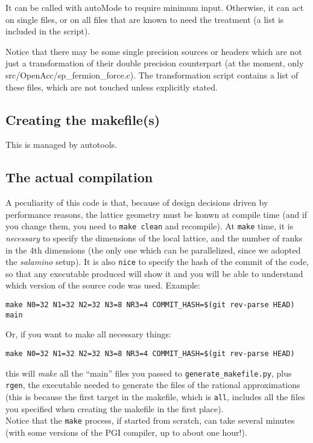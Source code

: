 It can be called with {\sf autoMode} to require minimum input. Otherwise, it can act on
single files, or on all files that are known to need the treatment (a list is included in the script).

Notice that there may be some single precision sources or headers which are not just a 
transformation of their double precision counterpart (at the moment, only 
{\sf src/OpenAcc/sp_fermion_force.c}). The transformation script contains a list
of these files, which are not touched unless explicitly stated.


\subsection{Creating the makefile(s)}

This is managed by autotools.

\subsection{The actual compilation}

A peculiarity of this code is that, because of design decisions driven by 
performance reasons, the lattice geometry must be konwn at compile time (and 
if you change them, you need to \verb|make clean| and recompile). At \verb|make|
time, it is \emph{necessary} to  specify the dimensions of the local lattice, 
and the number of ranks in the 4th dimensions (the only one which can be 
parallelized, since we adopted the \emph{salamino} setup). It is also 
\verb|nice| to specify the hash of the commit of the code, so that any 
executable produced will show it and you will be able to understand which 
version of the source code was used. Example:
\begin{verbatim}
make N0=32 N1=32 N2=32 N3=8 NR3=4 COMMIT_HASH=$(git rev-parse HEAD) main
\end{verbatim}
Or, if you want to make all necessary things:
\begin{verbatim}
make N0=32 N1=32 N2=32 N3=8 NR3=4 COMMIT_HASH=$(git rev-parse HEAD) 
\end{verbatim}
this will \emph{make} all the ``main'' files you passed to 
\verb|generate_makefile.py|, plus \verb|rgen|, the executable needed to 
generate the files of the rational approximations (this is because the first 
target in the makefile, which is \verb|all|, includes all the files you 
specified when creating the makefile in the first place).\\
Notice that the \verb|make| process, if started from scratch, can take several 
minutes (with some versions of the PGI compiler, up to about one hour!).

